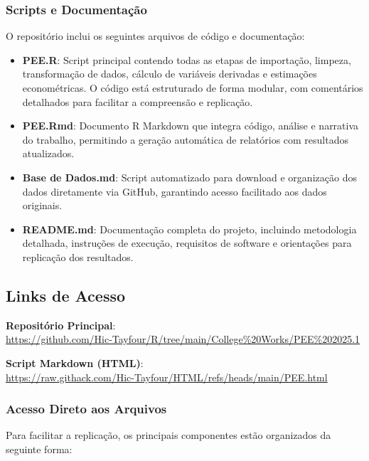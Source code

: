 \documentclass[a4paper,12pt]{article}
\begin{document}
\subsubsection*{Scripts e Documentação}

O repositório inclui os seguintes arquivos de código e documentação:

\begin{itemize}
    \item \textbf{PEE.R}: Script principal contendo todas as etapas de importação, limpeza, transformação de dados, cálculo de variáveis derivadas e estimações econométricas. O código está estruturado de forma modular, com comentários detalhados para facilitar a compreensão e replicação.
    
    \item \textbf{PEE.Rmd}: Documento R Markdown que integra código, análise e narrativa do trabalho, permitindo a geração automática de relatórios com resultados atualizados.
    
    \item \textbf{Base de Dados.md}: Script automatizado para download e organização dos dados diretamente via GitHub, garantindo acesso facilitado aos dados originais.
    
    \item \textbf{README.md}: Documentação completa do projeto, incluindo metodologia detalhada, instruções de execução, requisitos de software e orientações para replicação dos resultados.
\end{itemize}

\subsection*{Links de Acesso}

\textbf{Repositório Principal}: \\
\url{https://github.com/Hic-Tayfour/R/tree/main/College%20Works/PEE%202025.1}

\textbf{Script Markdown (HTML)}: \\
\url{https://raw.githack.com/Hic-Tayfour/HTML/refs/heads/main/PEE.html}

\subsubsection*{Acesso Direto aos Arquivos}

Para facilitar a replicação, os principais componentes estão organizados da seguinte forma:
\end{document}
